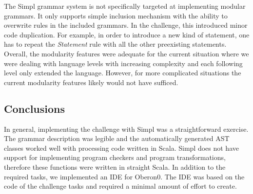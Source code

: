 The Simpl grammar system is not specifically targeted at implementing
modular grammars. It only supports simple inclusion mechanism with
the ability to overwrite rules in the included grammars. In the challenge,
this introduced minor code duplication. For example, in order to introduce
a new kind of statement, one has to repeat the \emph{Statement} rule
with all the other preexisting statements. Overall, the modularity
features were adequate for the current situation where we were dealing
with language levels with increasing complexity and each following
level only extended the language. However, for more complicated situations
the current modularity features likely would not have sufficed.


\subsection{Conclusions}

In general, implementing the challenge with Simpl was a straightforward
exercise. The grammar description was legible and the automatically
generated AST classes worked well with processing code written in
Scala. Simpl does not have support for implementing program checkers
and program transformations, therefore these functions were written
in straight Scala. In addition to the required tasks, we implemented
an IDE for Oberon0. The IDE was based on the code of the challenge
tasks and required a minimal amount of effort to create.


